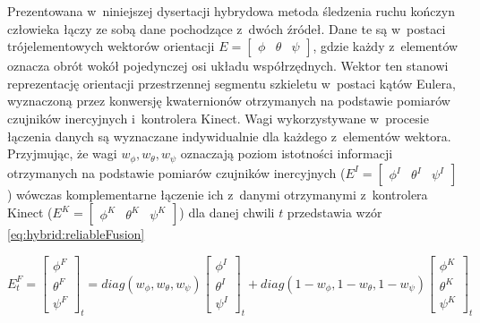 

Prezentowana w~niniejszej dysertacji hybrydowa metoda śledzenia ruchu kończyn człowieka łączy ze sobą dane pochodzące z~dwóch źródeł. Dane te są w~postaci trójelementowych wektorów orientacji $E = \begin{bmatrix} \phi &  \theta & \psi \end{bmatrix}$, gdzie każdy z~elementów oznacza obrót wokół pojedynczej osi układu współrzędnych. Wektor ten stanowi reprezentację orientacji przestrzennej segmentu szkieletu w~postaci kątów Eulera, wyznaczoną przez konwersję kwaternionów otrzymanych na podstawie pomiarów czujników inercyjnych i~kontrolera Kinect. Wagi wykorzystywane w~procesie łączenia danych są wyznaczane indywidualnie dla każdego z~elementów wektora. Przyjmując, że wagi $w_\phi , w_\theta , w_\psi$ oznaczają poziom istotności informacji otrzymanych na podstawie pomiarów czujników inercyjnych ($E^I = \begin{bmatrix}  \phi^I &  \theta^I &  \psi^I \end{bmatrix}$) wówczas komplementarne łączenie ich z~danymi otrzymanymi z~kontrolera Kinect ($E^K = \begin{bmatrix}  \phi^K &  \theta^K &  \psi^K \end{bmatrix}$) dla danej chwili $t$ przedstawia wzór \eqref{eq:hybrid:reliableFusion}

\begin{equation} E^F_t = 
	\begin{bmatrix}  \phi^F \\  \theta^F \\  \psi^F \end{bmatrix}_t = 
	diag(w_\phi,w_\theta,w_\psi)
	\begin{bmatrix}  \phi^I \\  \theta^I \\  \psi^I \end{bmatrix}_t + 
	diag(1-w_\phi,1-w_\theta,1-w_\psi)
	\begin{bmatrix}  \phi^K \\  \theta^K \\  \psi^K \end{bmatrix}_t
	\label{eq:hybrid:reliableFusion}
\end{equation}

